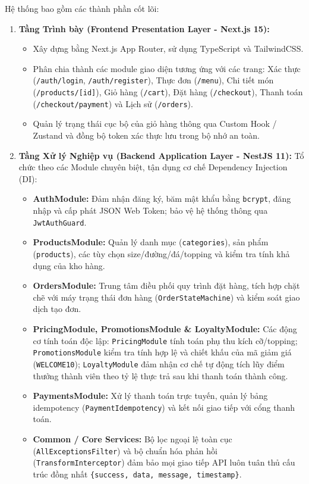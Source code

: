 \documentclass[12pt,a4paper,oneside]{report}
\begin{document}
Hệ thống bao gồm các thành phần cốt lõi:
\begin{enumerate}
    \item \textbf{Tầng Trình bày (Frontend Presentation Layer - Next.js 15):}
    \begin{itemize}
        \item Xây dựng bằng Next.js App Router, sử dụng TypeScript và TailwindCSS.
        \item Phân chia thành các module giao diện tương ứng với các trang: Xác thực (\texttt{/auth/login}, \texttt{/auth/register}), Thực đơn (\texttt{/menu}), Chi tiết món (\texttt{/products/[id]}), Giỏ hàng (\texttt{/cart}), Đặt hàng (\texttt{/checkout}), Thanh toán (\texttt{/checkout/payment}) và Lịch sử (\texttt{/orders}).
        \item Quản lý trạng thái cục bộ của giỏ hàng thông qua Custom Hook / Zustand và đồng bộ token xác thực lưu trong bộ nhớ an toàn.
    \end{itemize}
    \item \textbf{Tầng Xử lý Nghiệp vụ (Backend Application Layer - NestJS 11):}
    Tổ chức theo các Module chuyên biệt, tận dụng cơ chế Dependency Injection (DI):
    \begin{itemize}
        \item \textbf{AuthModule:} Đảm nhận đăng ký, băm mật khẩu bằng \texttt{bcrypt}, đăng nhập và cấp phát JSON Web Token; bảo vệ hệ thống thông qua \texttt{JwtAuthGuard}.
        \item \textbf{ProductsModule:} Quản lý danh mục (\texttt{categories}), sản phẩm (\texttt{products}), các tùy chọn size/đường/đá/topping và kiểm tra tính khả dụng của kho hàng.
        \item \textbf{OrdersModule:} Trung tâm điều phối quy trình đặt hàng, tích hợp chặt chẽ với máy trạng thái đơn hàng (\texttt{OrderStateMachine}) và kiểm soát giao dịch tạo đơn.
        \item \textbf{PricingModule, PromotionsModule \& LoyaltyModule:} Các động cơ tính toán độc lập: \texttt{PricingModule} tính toán phụ thu kích cỡ/topping; \texttt{PromotionsModule} kiểm tra tính hợp lệ và chiết khấu của mã giảm giá (\texttt{WELCOME10}); \texttt{LoyaltyModule} đảm nhận cơ chế tự động tích lũy điểm thưởng thành viên theo tỷ lệ thực trả sau khi thanh toán thành công.
        \item \textbf{PaymentsModule:} Xử lý thanh toán trực tuyến, quản lý bảng idempotency (\texttt{PaymentIdempotency}) và kết nối giao tiếp với cổng thanh toán.
        \item \textbf{Common / Core Services:} Bộ lọc ngoại lệ toàn cục (\texttt{AllExceptionsFilter}) và bộ chuẩn hóa phản hồi (\texttt{TransformInterceptor}) đảm bảo mọi giao tiếp API luôn tuân thủ cấu trúc đồng nhất \texttt{\{success, data, message, timestamp\}}.

\end{itemize}
\end{enumerate}
\end{document}
